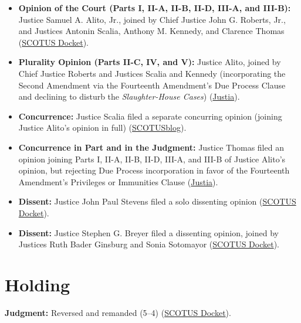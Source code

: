 \documentclass[12pt]{article}
\begin{document}
\begin{itemize}
\item \textbf{Opinion of the Court (Parts I, II-A, II-B, II-D, III-A, and III-B):} Justice Samuel A. Alito, Jr., joined by Chief Justice John G. Roberts, Jr., and Justices Antonin Scalia, Anthony M. Kennedy, and Clarence Thomas (\href{https://www.supremecourt.gov/docket/docketfiles/html/public/08-1521.html}{SCOTUS Docket}).
\item \textbf{Plurality Opinion (Parts II-C, IV, and V):} Justice Alito, joined by Chief Justice Roberts and Justices Scalia and Kennedy (incorporating the Second Amendment via the Fourteenth Amendment's Due Process Clause and declining to disturb the \textit{Slaughter-House Cases}) (\href{https://supreme.justia.com/cases/federal/us/561/742/}{Justia}).
\item \textbf{Concurrence:} Justice Scalia filed a separate concurring opinion (joining Justice Alito's opinion in full) (\href{https://www.scotusblog.com/cases/mcdonald-v-city-of-chicago/}{SCOTUSblog}).
\item \textbf{Concurrence in Part and in the Judgment:} Justice Thomas filed an opinion joining Parts I, II-A, II-B, II-D, III-A, and III-B of Justice Alito's opinion, but rejecting Due Process incorporation in favor of the Fourteenth Amendment's Privileges or Immunities Clause (\href{https://supreme.justia.com/cases/federal/us/561/742/}{Justia}).
\item \textbf{Dissent:} Justice John Paul Stevens filed a solo dissenting opinion (\href{https://www.supremecourt.gov/docket/docketfiles/html/public/08-1521.html}{SCOTUS Docket}).
\item \textbf{Dissent:} Justice Stephen G. Breyer filed a dissenting opinion, joined by Justices Ruth Bader Ginsburg and Sonia Sotomayor (\href{https://www.supremecourt.gov/docket/docketfiles/html/public/08-1521.html}{SCOTUS Docket}).
\end{itemize}

\section{Holding}

\textbf{Judgment:} Reversed and remanded (5--4) (\href{https://www.supremecourt.gov/docket/docketfiles/html/public/08-1521.html}{SCOTUS Docket}).
\end{document}
